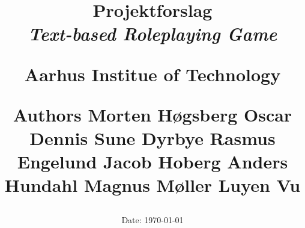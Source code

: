 \newcommand{\authorName}{}
\newcommand{\titleName}{Projektforslag}
\newcommand{\subject}{Text-based Roleplaying Game}
\newcommand{\institute}{Aarhus Institue of Technology}

\begin{titlepage}
  \centering
    \title%
    {%
      \Huge \textbf{\titleName}\\
      \scale{\numberSQRTTWO}{\vspace{\sol pt}}
      \LARGE \textit{\subject}
      \scale{\numberSQRTTWO}{\rule{\linewidth}{\sol pt}}

      \textbf{\institute}
      \author{}

      \Large \textbf{Authors} \linebreak
      Morten Høgsberg \linebreak
      Oscar Dennis \linebreak
      Sune Dyrbye \linebreak
      Rasmus Engelund \linebreak
      Jacob Hoberg \linebreak
      Anders Hundahl \linebreak
      Magnus Møller \linebreak
      Luyen Vu
      \date{\Large Date: \today}
    }

\end{titlepage}

